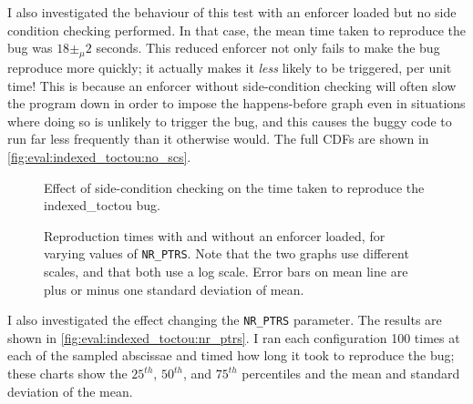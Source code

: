 I also investigated the behaviour of this test with an enforcer loaded
but no side condition checking performed.  In that case, the mean time
taken to reproduce the bug was $18 \pm_\mu 2$ seconds.  This reduced
enforcer not only fails to make the bug reproduce more quickly; it
actually makes it \emph{less} likely to be triggered, per unit time!
This is because an enforcer without side-condition checking will often
slow the program down in order to impose the happens-before graph even
in situations where doing so is unlikely to trigger the bug, and this
causes the buggy code to run far less frequently than it otherwise
would.  The full CDFs are shown in
\autoref{fig:eval:indexed_toctou:no_scs}.

\begin{figure}
  
  \caption{Effect of side-condition checking on the time taken to
    reproduce the indexed\_toctou bug.}
  \label{fig:eval:indexed_toctou:no_scs}
\end{figure}

\begin{figure}
  \caption{Reproduction times with and without an enforcer loaded, for
    varying values of \texttt{NR\_PTRS}.  Note that the two graphs use
    different scales, and that both use a log scale.  Error bars on
    mean line are plus or minus one standard deviation of mean.}
  \label{fig:eval:indexed_toctou:nr_ptrs}
\end{figure}

I also investigated the effect changing the \texttt{NR\_PTRS}
parameter.  The results are shown in
\autoref{fig:eval:indexed_toctou:nr_ptrs}.  I ran each configuration
100 times at each of the sampled abscissae and timed how long it took
to reproduce the bug; these charts show the $25^{th}$, $50^{th}$, and
$75^{th}$ percentiles and the mean and standard deviation of the mean.

